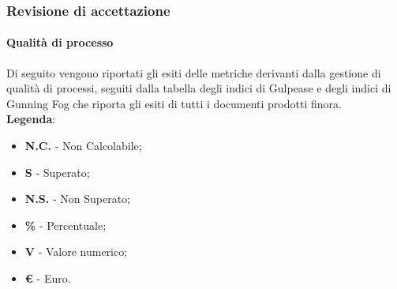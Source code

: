 	\subsubsection{Revisione di accettazione}
	\paragraph{Qualità di processo}
		Di seguito vengono riportati gli esiti delle metriche derivanti dalla gestione di qualità di processi, seguiti dalla tabella degli indici di Gulpease e degli indici di Gunning Fog che riporta gli esiti di tutti i documenti prodotti finora. \\
\textbf{Legenda}:
\begin{itemize}
	\item \textbf{N.C.} - Non Calcolabile;
	\item \textbf{S} - Superato;
	\item \textbf{N.S.} - Non Superato;
	\item \textbf{\%} - Percentuale;
	\item \textbf{V} - Valore numerico;
	\item \textbf{\euro{}} - Euro.
\end{itemize}
